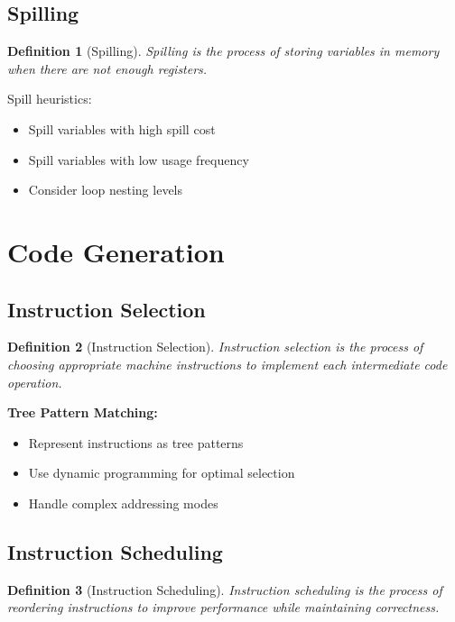\documentclass[11pt]{article}
\newtheorem{definition}{Definition}[section]
\begin{document}
\subsection{Spilling}

\begin{definition}[Spilling]
Spilling is the process of storing variables in memory when there are not enough registers.
\end{definition}

Spill heuristics:
\begin{itemize}
    \item Spill variables with high spill cost
    \item Spill variables with low usage frequency
    \item Consider loop nesting levels
\end{itemize}

\section{Code Generation}

\subsection{Instruction Selection}

\begin{definition}[Instruction Selection]
Instruction selection is the process of choosing appropriate machine instructions to implement each intermediate code operation.
\end{definition}

\textbf{Tree Pattern Matching:}
\begin{itemize}
    \item Represent instructions as tree patterns
    \item Use dynamic programming for optimal selection
    \item Handle complex addressing modes
\end{itemize}

\subsection{Instruction Scheduling}

\begin{definition}[Instruction Scheduling]
Instruction scheduling is the process of reordering instructions to improve performance while maintaining correctness.
\end{definition}
\end{document}

